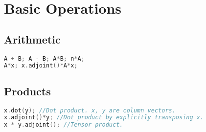 \documentclass[12pt]{article}
\begin{document}
\section{Basic Operations}
\subsection{Arithmetic}
\begin{lstlisting}[language=c++]
A + B; A - B; A*B; n*A;
A*x; x.adjoint()*A*x;
\end{lstlisting}
\subsection{Products}
\begin{lstlisting}[language=c++]
x.dot(y); //Dot product. x, y are column vectors.
x.adjoint()*y; //Dot product by explicitly transposing x.
x * y.adjoint(); //Tensor product.
\end{lstlisting}
\end{document}
